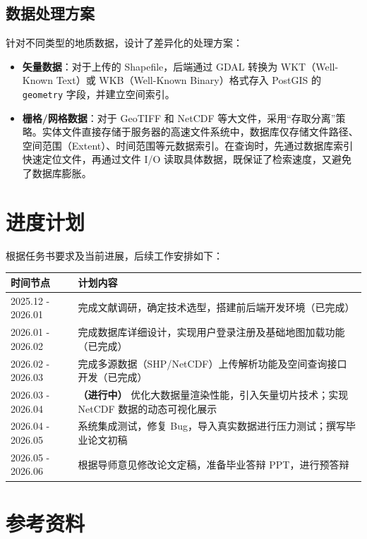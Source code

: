 \documentclass[a4paper,12pt]{ctexart}
\begin{document}
\subsection{数据处理方案}
针对不同类型的地质数据，设计了差异化的处理方案：
\begin{itemize}
    \item \textbf{矢量数据}：对于上传的 Shapefile，后端通过 GDAL 转换为 WKT（Well-Known Text）或 WKB（Well-Known Binary）格式存入 PostGIS 的 \texttt{geometry} 字段，并建立空间索引。
    \item \textbf{栅格/网格数据}：对于 GeoTIFF 和 NetCDF 等大文件，采用“存取分离”策略。实体文件直接存储于服务器的高速文件系统中，数据库仅存储文件路径、空间范围（Extent）、时间范围等元数据索引。在查询时，先通过数据库索引快速定位文件，再通过文件 I/O 读取具体数据，既保证了检索速度，又避免了数据库膨胀。
\end{itemize}

\section{进度计划}

根据任务书要求及当前进展，后续工作安排如下：

\begin{table}[h]
\centering
\begin{tabular}{|p{4cm}|p{10cm}|}
\hline
\textbf{时间节点} & \textbf{计划内容} \\
\hline
2025.12 - 2026.01 & 完成文献调研，确定技术选型，搭建前后端开发环境（已完成） \\
\hline
2026.01 - 2026.02 & 完成数据库详细设计，实现用户登录注册及基础地图加载功能（已完成） \\
\hline
2026.02 - 2026.03 & 完成多源数据（SHP/NetCDF）上传解析功能及空间查询接口开发（已完成） \\
\hline
2026.03 - 2026.04 & \textbf{（进行中）} 优化大数据量渲染性能，引入矢量切片技术；实现 NetCDF 数据的动态可视化展示 \\
\hline
2026.04 - 2026.05 & 系统集成测试，修复 Bug，导入真实数据进行压力测试；撰写毕业论文初稿 \\
\hline
2026.05 - 2026.06 & 根据导师意见修改论文定稿，准备毕业答辩 PPT，进行预答辩 \\
\hline
\end{tabular}
\end{table}

\section{参考资料}
\end{document}
